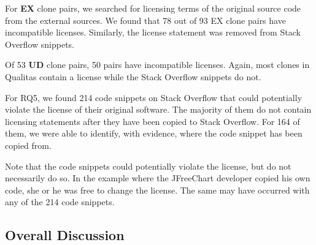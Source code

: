 \documentclass[10pt,journal,compsoc]{IEEEtran}
\newenvironment{boxquote}{\vspace{-1ex}\setlength{\FrameSep}{1\fboxsep}\begin{framed}\setlength{\parskip}{0.5\baselineskip}\setlength{\parindent}{0pt}}{\end{framed}}
\begin{document}
For \textbf{EX}
clone pairs, we searched for licensing terms of the original source code from
the external sources. We found that 78 out of 93 EX clone pairs have
incompatible licenses. %
Similarly, the license statement was removed from Stack Overflow snippets. 

Of 53 \textbf{UD} clone pairs, 50 pairs have incompatible licenses. Again, most
clones in Qualitas contain a license while the Stack Overflow snippets do not.
%

\begin{boxquote}
For RQ5, we found 214 code snippets on Stack Overflow that
could potentially violate the license of their original software. The majority of them
do not contain licensing statements after they have been copied to
Stack Overflow. For 164 of them, we were able to identify,
with evidence, where the code snippet has been copied from.
\end{boxquote}

Note that the code snippets could potentially violate the license, but do
not necessarily do so. In the example where the JFreeChart
developer copied his own code, she or he was free to change the
license. The same may have occurred with any of the 214 code
snippets.

\subsection{Overall Discussion} %
\end{document}
